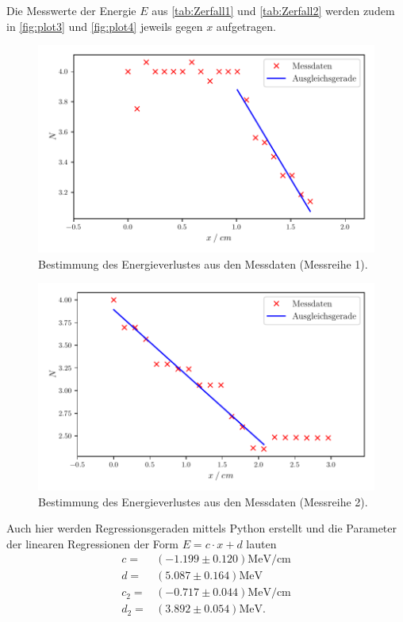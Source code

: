 Die Messwerte der Energie $E$ aus \autoref{tab:Zerfall1} und \autoref{tab:Zerfall2} werden zudem in \autoref{fig:plot3} und \autoref{fig:plot4}
jeweils gegen $x$ aufgetragen.

\begin{figure}[H]
  \centering
  \includegraphics[width=\textwidth]{build/plot3.pdf}
  \caption {Bestimmung des Energieverlustes aus den Messdaten (Messreihe 1).}
  \label{fig:plot3}
\end{figure}

\begin{figure}[H]
  \centering
  \includegraphics[width=\textwidth]{build/plot4.pdf}
  \caption {Bestimmung des Energieverlustes aus den Messdaten (Messreihe 2).}
  \label{fig:plot4}
\end{figure}

Auch hier werden Regressionsgeraden mittels Python erstellt und die Parameter der linearen Regressionen der Form
$E=c \cdot x +d $ lauten
\begin{align*}
  c =& (-1.199 \pm  0.120)\si{\mega\eV\per\centi\meter}\\
  d =& (5.087 \pm 0.164) \si{\mega\eV}\\
  c_2 =& (-0.717 \pm  0.044)\si{\mega\eV\per\centi\meter}\\
  d_2 =& (3.892 \pm 0.054) \si{\mega\eV}.
\end{align*}

